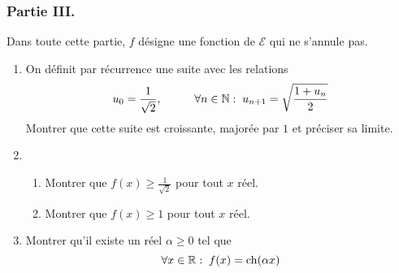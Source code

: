 \subsubsection*{Partie III.}
Dans toute cette partie, $f$ désigne une fonction de $\mathcal E$ qui ne s'annule pas.
\begin{enumerate}
 \item On définit par récurrence une suite avec les relations
\begin{displaymath}
 u_0=\frac{1}{\sqrt{2}},\hspace{1cm}\forall n\in \mathbb{N} :\; u_{n+1}=\sqrt{\frac{1+u_n}{2}}
\end{displaymath}
 Montrer que cette suite est croissante, majorée par $1$ et préciser sa limite.
 \item
\begin{enumerate}
 \item Montrer que $f(x)\geq\frac{1}{\sqrt{2}}$ pour tout $x$ réel.
 \item Montrer que $f(x)\geq 1$ pour tout $x$ réel.
\end{enumerate}
\item Montrer qu'il existe un réel $\alpha \geq 0$ tel que
\begin{displaymath}
 \forall x\in \mathbb{R} :\; f(x)=\operatorname{ch}(\alpha x)
\end{displaymath}

\end{enumerate}
